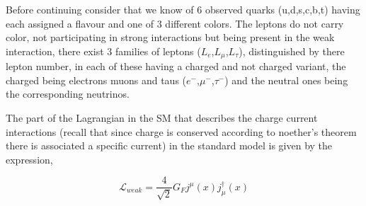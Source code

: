 \documentclass[11pt,twoside,a4paper]{article}
\begin{document}
Before continuing consider that we know of 6 observed quarks (u,d,s,c,b,t) having each assigned a flavour and one of 3 different colors. The leptons do not carry color, not participating in strong interactions but being present in the weak interaction, there exist 3 families of leptons ($L_e$,$L_\mu$,$L_\tau$), distinguished by there lepton number, in each of these having a charged and not charged variant, the charged being electrons muons and taus ($e^-$,$\mu^-$,$\tau^-$) and the neutral ones being the corresponding neutrinos.     

The part of the Lagrangian in the SM that describes the charge current interactions (recall that since charge is conserved according to noether's theorem there is associated a specific current) in the standard model is given by the expression, 

\begin{equation}
\mathcal{L}_{weak}=\frac{4}{\sqrt{2}} G_F j^\mu (x) j^\dagger_\mu (x)
\end{equation}
\end{document}
